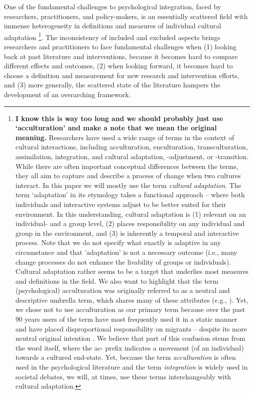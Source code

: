 \documentclass[man, 12pt, a4paper]{apa7}
\begin{document}
One of the fundamental challenges to psychological integration, faced by researchers, practitioners, and policy-makers, is an essentially scattered field with immense heterogeneity in definitions and measures of individual cultural adaptation
\footnote{\textbf{I know this is way too long and we should probably just use `acculturation' and make a note that we mean the original meaning.} Researchers have used a wide range of terms in the context of cultural interactions, including acculturation, enculturation, transculturation, assimilation, integration, and cultural adaptation, -adjustment, or -transition. While there are often important conceptual differences between the terms, they all aim to capture and describe a process of change when two cultures interact. In this paper we will mostly use the term \textit{cultural adaptation}. The term `adaptation' in its etymology takes a functional approach -- where both individuals and interactive systems adjust to be better suited for their environment. In this understanding, cultural adaptation is (1) relevant on an individual- and a group level, (2) places responsibility on any individual and group in the environment, and (3) is inherently a temporal and interactive process. Note that we do not specify what exactly is adaptive in any circumstance and that 'adaptation' is not a necessary outcome (i.e., many change processes do not enhance the livability of groups or individuals). Cultural adaptation rather seems to be a target that underlies most measures and definitions in the field. We also want to highlight that the term (psychological) acculturation was originally referred to as a neutral and descriptive umbrella term, which shares many of these attributes (e.g., \citealp{Berry2003}). Yet, we chose not to use acculturation as our primary term because over the past 90 years users of the term have most frequently used it in a static manner \citep{Brown2011, Ward2019} and have placed disproportional responsibility on migrants \citep{Bourhis1997a} -- despite its more neutral original intention \citep[e.g.,][]{Berry2009a}. We believe that part of this confusion stems from the word itself, where the ac- prefix indicates a movement (of an individual) towards a cultured end-state. Yet, because the term \textit{acculturation} is often used in the psychological literature and the term \textit{integration} is widely used in societal debates, we will, at times, use these terms interchangeably with cultural adaptation.}.
The inconsistency of included and excluded aspects brings researchers and practitioners to face fundamental challenges when (1) looking back at past literature and interventions, because it becomes hard to compare different effects and outcomes, (2) when looking forward, it becomes hard to choose a definition and measurement for new research and intervention efforts, and (3) more generally, the scattered state of the literature hampers the development of an overarching framework.
\end{document}
